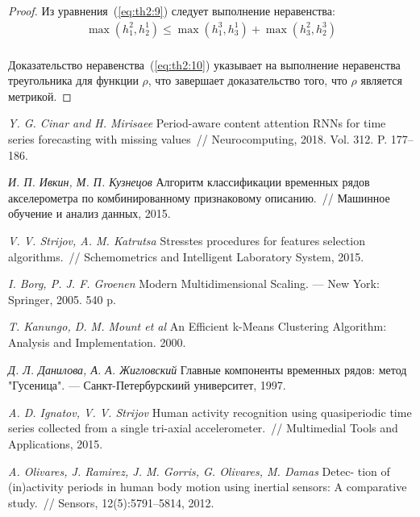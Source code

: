\documentclass[12pt, twoside]{article}
\numberwithin{equation}{section}
\begin{document}
\begin{proof}
Из уравнения~(\ref{eq:th2:9}) следует выполнение неравенства:
\begin{equation}
\label{eq:th2:10}
\begin{aligned}
\max\left(h_{1}^{2}, h_{2}^{1}\right) \leq  \max\left(h_{1}^{3}, h_{3}^{1}\right) + \max\left(h_{3}^{2}, h_{2}^{3}\right)\\
\end{aligned}
\end{equation}

Доказательство неравенства~(\ref{eq:th2:10}) указывает на выполнение неравенства треугольника для функции $\rho$, что завершает доказательство того, что $\rho$ является метрикой.

\end{proof}

\begin{thebibliography}{99}
	\textit{Y. G. Cinar and H. Mirisaee} Period-aware content attention RNNs for time series forecasting with missing values~// Neurocomputing, 2018. Vol. 312. P. 177--186.
	
	\textit{И. П. Ивкин,  М. П. Кузнецов} Алгоритм классификации временных рядов акселерометра по комбинированному признаковому описанию.~// Машинное обучение и анализ данных, 2015.
	
	\textit{V. V. Strijov, A. M. Katrutsa} Stresstes procedures for features selection algorithms.~// Schemometrics and Intelligent Laboratory System, 2015.
	
	\textit{I. Borg, P. J. F. Groenen} Modern Multidimensional Scaling. --- New York: Springer, 2005. 540 p.
	
	\textit{T. Kanungo, D. M. Mount et al} An Efficient k-Means Clustering Algorithm: Analysis and Implementation. 2000.
	
	\textit{Д. Л. Данилова, А. А. Жигловский} Главные компоненты временных рядов: метод "Гусеница". --- Санкт-Петербурскиий университет, 1997.
	
	\textit{A. D. Ignatov, V. V. Strijov} Human activity recognition using quasiperiodic time series collected from a single tri-axial accelerometer.~// Multimedial Tools and Applications, 2015.
	
	\textit{A. Olivares, J. Ramirez, J. M. Gorris, G. Olivares, M. Damas} Detec- tion of (in)activity periods in human body motion using inertial sensors: A comparative study.~// Sensors, 12(5):5791–5814, 2012.

	
\end{thebibliography}
\end{document}
